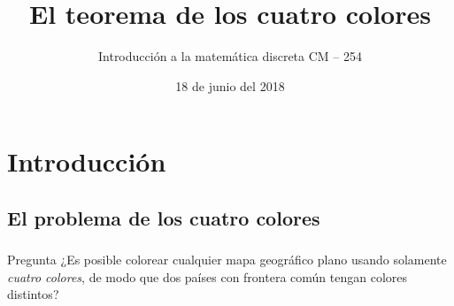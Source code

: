 \documentclass[spanish, utf8,handout]{beamer} %
\title[Teorema de los cuatro colores]{\Huge\sffamily El teorema de los cuatro colores}
\subtitle{Introducción a la matemática discreta CM -- 254}
\author[Grupo N$^\circ6$]{%
	\texorpdfstring{%
		\begin{columns}
			\column{.3\linewidth}
			\centering
			C. Aznarán Laos %
			\column{.3\linewidth}
			\centering
			F. Cruz Ordoñez %
		\end{columns}
		\vspace{12pt}
		\begin{columns}
			\column{.3\linewidth}
			\centering
			G. Quiroz Gómez %
			\column{.3\linewidth}
			\centering
			J. Navío Torres %
		\end{columns}
	}
	{Author 1, Author 2, Author 3}
}
\institute[FC -- UNI]{\large%
	Facultad de Ciencias \and%
	Universidad Nacional de Ingeniería
}
\date{18 de junio del 2018}
\theoremstyle{definition}
\begin{document}
\begin{frame}[plain]
\maketitle
\end{frame}

\begin{frame}{\contentsname}\transblindsvertical
\tableofcontents
\end{frame}

\section{Introducción}

\subsection{El problema de los cuatro colores}

\begin{frame}\transblindsvertical
\frametitle{\insertsubsection}

\begin{alertblock}{Pregunta} %
¿Es posible colorear cualquier mapa geográfico plano usando solamente \emph{\color{DarkBlue}cuatro colores}, de modo que dos países con frontera común tengan colores distintos? 
\end{alertblock}

\

\end{frame}
\end{document}
